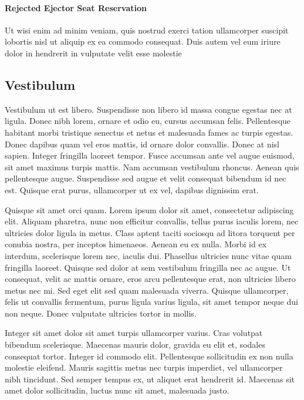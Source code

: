 \documentclass[review,journal]{vgtc}         %
\begin{document}
\paragraph{Rejected Ejector Seat Reservation}

Ut wisi enim ad minim veniam, quis nostrud exerci tation ullamcorper
suscipit lobortis nisl ut aliquip ex ea commodo consequat. Duis autem
vel eum iriure dolor in hendrerit in vulputate velit esse molestie

\subsection{Vestibulum}

Vestibulum ut est libero. Suspendisse non libero id massa congue egestas nec at ligula. Donec nibh lorem, ornare et odio eu, cursus accumsan felis. Pellentesque habitant morbi tristique senectus et netus et malesuada fames ac turpis egestas. Donec dapibus quam vel eros mattis, id ornare dolor convallis. Donec at nisl sapien. Integer fringilla laoreet tempor. Fusce accumsan ante vel augue euismod, sit amet maximus turpis mattis. Nam accumsan vestibulum rhoncus. Aenean quis pellentesque augue. Suspendisse sed augue et velit consequat bibendum id nec est. Quisque erat purus, ullamcorper ut ex vel, dapibus dignissim erat.

Quisque sit amet orci quam. Lorem ipsum dolor sit amet, consectetur adipiscing elit. Aliquam pharetra, nunc non efficitur convallis, tellus purus iaculis lorem, nec ultricies dolor ligula in metus. Class aptent taciti sociosqu ad litora torquent per conubia nostra, per inceptos himenaeos. Aenean eu ex nulla. Morbi id ex interdum, scelerisque lorem nec, iaculis dui. Phasellus ultricies nunc vitae quam fringilla laoreet. Quisque sed dolor at sem vestibulum fringilla nec ac augue. Ut consequat, velit ac mattis ornare, eros arcu pellentesque erat, non ultricies libero metus nec mi. Sed eget elit sed quam malesuada viverra. Quisque ullamcorper, felis ut convallis fermentum, purus ligula varius ligula, sit amet tempor neque dui non neque. Donec vulputate ultricies tortor in mollis.

Integer sit amet dolor sit amet turpis ullamcorper varius. Cras volutpat bibendum scelerisque. Maecenas mauris dolor, gravida eu elit et, sodales consequat tortor. Integer id commodo elit. Pellentesque sollicitudin ex non nulla molestie eleifend. Mauris sagittis metus nec turpis imperdiet, vel ullamcorper nibh tincidunt. Sed semper tempus ex, ut aliquet erat hendrerit id. Maecenas sit amet dolor sollicitudin, luctus nunc sit amet, malesuada justo.
\end{document}
